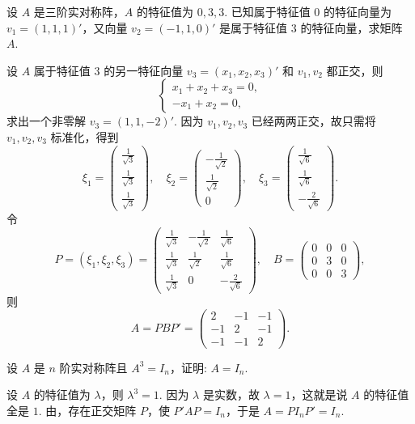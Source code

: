 \documentclass[../../main.tex]{subfiles}
\begin{document}
\begin{example}
设 $A$ 是三阶实对称阵，$A$ 的特征值为 $0,3,3$. 已知属于特征值 $0$ 的特征向量为 $v_1 = (1,1,1)'$，又向量 $v_2 = (-1,1,0)'$ 是属于特征值 $3$ 的特征向量，求矩阵 $A$.
\end{example}
\begin{solution}
设 $A$ 属于特征值 $3$ 的另一特征向量 $v_3 = (x_1,x_2,x_3)'$ 和 $v_1,v_2$ 都正交，则
\[
\begin{cases}
x_1 + x_2 + x_3 = 0, \\
-x_1 + x_2 = 0,
\end{cases}
\]
求出一个非零解 $v_3 = (1,1,-2)'$. 因为 $v_1,v_2,v_3$ 已经两两正交，故只需将 $v_1,v_2,v_3$ 标准化，得到
\[
\xi_1 = 
\begin{pmatrix}
\frac{1}{\sqrt{3}} \\
\frac{1}{\sqrt{3}} \\
\frac{1}{\sqrt{3}}
\end{pmatrix}, \quad 
\xi_2 = 
\begin{pmatrix}
-\frac{1}{\sqrt{2}} \\
\frac{1}{\sqrt{2}} \\
0
\end{pmatrix}, \quad 
\xi_3 = 
\begin{pmatrix}
\frac{1}{\sqrt{6}} \\
\frac{1}{\sqrt{6}} \\
-\frac{2}{\sqrt{6}}
\end{pmatrix}.
\]
令
\[
P = (\xi_1,\xi_2,\xi_3) = 
\begin{pmatrix}
\frac{1}{\sqrt{3}} & -\frac{1}{\sqrt{2}} & \frac{1}{\sqrt{6}} \\
\frac{1}{\sqrt{3}} & \frac{1}{\sqrt{2}} & \frac{1}{\sqrt{6}} \\
\frac{1}{\sqrt{3}} & 0 & -\frac{2}{\sqrt{6}}
\end{pmatrix}, \quad 
B = 
\begin{pmatrix}
0 & 0 & 0 \\
0 & 3 & 0 \\
0 & 0 & 3
\end{pmatrix},
\]
则
\[
A = PBP' = 
\begin{pmatrix}
2 & -1 & -1 \\
-1 & 2 & -1 \\
-1 & -1 & 2
\end{pmatrix}.
\]

\end{solution}

\begin{example}
设 $A$ 是 $n$ 阶实对称阵且 $A^3 = I_n$，证明: $A = I_n$.
\end{example}
\begin{solution}
设 $A$ 的特征值为 $\lambda$，则 $\lambda^3 = 1$. 因为 $\lambda$ 是实数，故 $\lambda = 1$，这就是说 $A$ 的特征值全是 $1$. 由，存在正交矩阵 $P$，使 $P'AP = I_n$，于是 $A = PI_nP' = I_n$.

\end{solution}
\end{document}
